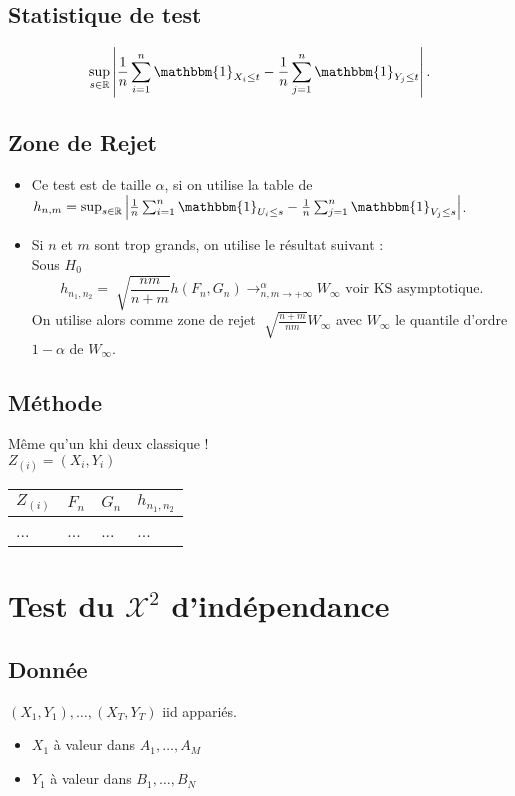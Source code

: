 \documentclass{article}
\theoremstyle{plain}%
\theoremstyle{definition}
\theoremstyle{remark}
\begin{document}
\subsection*{Statistique de test}
\[
    \sup _{s \in \mathbb{R}} \left| \frac{1}{n}\sum_{i=1}^{n} \mathbbm{1}_{X_i \leq t} - \frac{1}{n}\sum_{j=1}^{n} \mathbbm{1}_{Y_j \leq t} \right| 
.\]
\subsection*{Zone de Rejet}
\begin{itemize}
    \item Ce test est de taille $ \alpha  $, si on utilise la table de $ h_{n,m} = \sup _{s \in \mathbb{R}} \left| \frac{1}{n}\sum_{i=1}^{n} \mathbbm{1}_{U_i \leq s} - \frac{1}{n}\sum_{j=1}^{n} \mathbbm{1}_{V_j \leq s} \right| $.
    \item Si $ n $ et $ m $ sont trop grands, on utilise le résultat suivant : \\
        Sous $ H_0 $ 
        \[
            h_{n_1, n_2} = \sqrt[]{\frac{nm}{n+m}}h(F_n, G_n) \to ^{\alpha }_{n,m \to +\infty } W_\infty \text{ voir KS asymptotique}
        .\]
        On utilise alors comme zone de rejet $ \sqrt[]{\frac{n+m}{nm}}W_\infty  $ avec $ W_\infty  $ le quantile d'ordre $ 1 - \alpha  $ de $ W_\infty  $.
\end{itemize}

\subsection*{Méthode}
Même qu'un khi deux classique !\\
$ Z_{(i)} = (X_i, Y_i) $ 
\begin{table}[!t]
    \centering
    \begin{tabular}{|l|l|l|l|}
    \hline
        $Z_{(i)}$ & $F_n$ & $G_n$ & $h_{n_1, n_2}$ \\ \hline
        ... & ... & ... & ... \\ \hline
    \end{tabular}
\end{table}

\section{Test du $ \mathcal{X}^2 $ d'indépendance}
\subsection*{Donnée}
    $ (X_1, Y_1), \dots, (X_T, Y_T) $ iid appariés. \begin{itemize}
        \item $ X_1 $ à valeur dans $ A_1, \dots, A_M $ 
        \item $ Y_1 $ à valeur dans $ B_1, \dots, B_N $ 
    \end{itemize}
\end{document}
